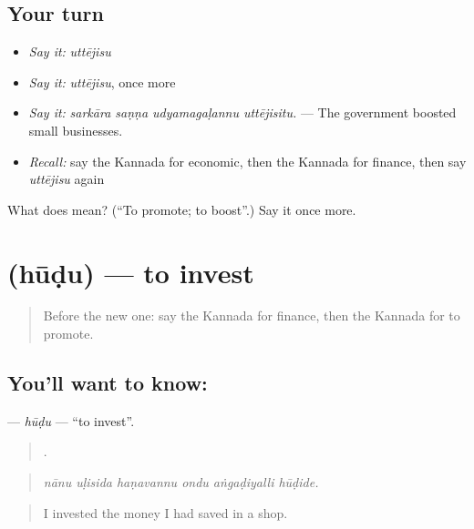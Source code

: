 \subsection*{Your turn}
\begin{itemize}
\raggedright
  \item \emph{Say it:} \emph{uttējisu}
  \item \emph{Say it:} \emph{uttējisu}, once more
  \item \emph{Say it:} \emph{sarkāra saṇṇa udyamagaḷannu uttējisitu.} — The government boosted small businesses.
  \item \emph{Recall:} say the Kannada for economic, then the Kannada for finance, then say \emph{uttējisu} again
\end{itemize}

\begin{tcolorbox}[breakable,colback=teal!4,colframe=teal!35!black,title={Before you move on}]
What does  mean? (\textquotedblleft{}To promote; to boost\textquotedblright{}.) Say it once more.
\end{tcolorbox}
\section[\texorpdfstring{\kn{ಹೂಡು} (hūḍu)}{ಹೂಡು (hūḍu)}]{ (hūḍu) — to invest}

\label{lesson:KA-C401-hudu}



\begin{quote}
Before the new one: say the Kannada for finance, then the Kannada for to promote.
\end{quote}

\subsection*{You'll want to know: }
\textbf{} — \emph{hūḍu} — \textquotedblleft{}to invest\textquotedblright{}.

\begin{quote}
     .
\end{quote}

\begin{quote}
\emph{nānu uḷisida haṇavannu ondu aṅgaḍiyalli hūḍide.}
\end{quote}

\begin{quote}
I invested the money I had saved in a shop.
\end{quote}

